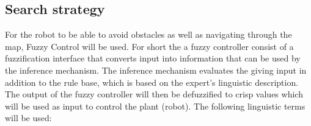 \documentclass[../Head/Main.tex]{subfiles}
\begin{document}
\subsection{Search strategy}
\label{subsec:searhStrategyDesign}

For the robot to be able to avoid obstacles as well as navigating through the map, Fuzzy Control will be used. For short the a fuzzy controller consist of a fuzzification interface that converts input into information that can be used by the inference mechanism. The inference mechanism evaluates the giving input in addition to the rule base, which is based on the expert's linguistic description. The output of the fuzzy controller will then be defuzzified to crisp values which will be used as input to control the plant (robot). The following linguistic terms will be used:
\end{document}
